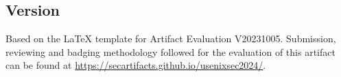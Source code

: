 

\subsection{Version}
Based on the LaTeX template for Artifact Evaluation V20231005. Submission,
reviewing and badging methodology followed for the evaluation of this artifact
can be found at \url{https://secartifacts.github.io/usenixsec2024/}.